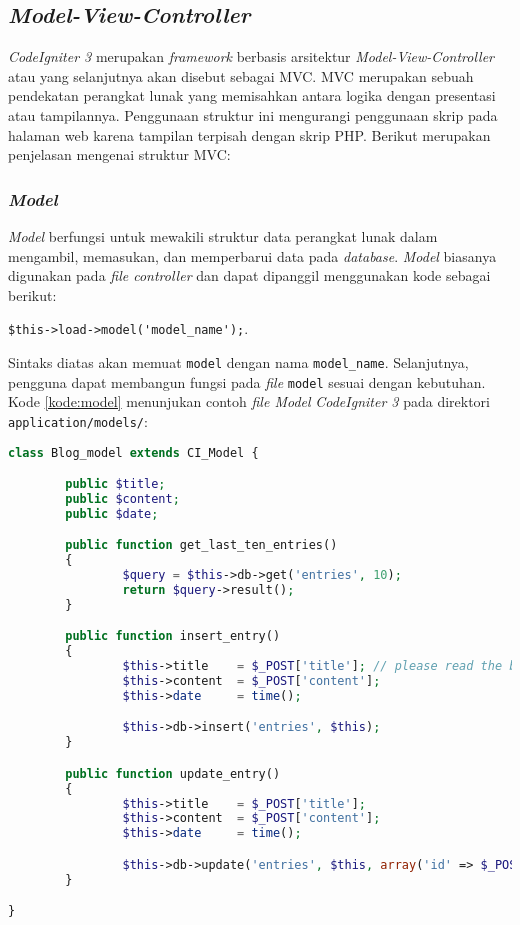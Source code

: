 \subsection{\textit{Model-View-Controller}}
\textit{CodeIgniter 3} merupakan \textit{framework} berbasis arsitektur \textit{Model-View-Controller} atau yang selanjutnya akan disebut sebagai MVC. MVC merupakan sebuah pendekatan perangkat lunak yang memisahkan antara logika dengan presentasi atau tampilannya. Penggunaan struktur ini mengurangi penggunaan skrip pada halaman web karena tampilan terpisah dengan skrip PHP. Berikut merupakan penjelasan mengenai struktur MVC:

\subsubsection{\textit{Model}} \textit{Model} berfungsi untuk mewakili struktur data perangkat lunak dalam mengambil, memasukan, dan memperbarui data pada \textit{database}. \textit{Model} biasanya digunakan pada \textit{file controller} dan dapat dipanggil menggunakan kode sebagai berikut: 
\begin{center}
\verb|$this->load->model('model_name');|.
\end{center}
Sintaks diatas akan memuat \texttt{model} dengan nama \texttt{model\_name}. Selanjutnya, pengguna dapat membangun fungsi pada \textit{file} \texttt{model} sesuai dengan kebutuhan. Kode \ref{kode:model} menunjukan contoh \textit{file Model} \textit{CodeIgniter 3} pada direktori \verb|application/models/|:

\begin{lstlisting}[language=PHP, caption=Contoh \textit{model} pada \textit{CodeIgniter 3}, label=kode:model]
class Blog_model extends CI_Model {

        public $title;
        public $content;
        public $date;

        public function get_last_ten_entries()
        {
                $query = $this->db->get('entries', 10);
                return $query->result();
        }

        public function insert_entry()
        {
                $this->title    = $_POST['title']; // please read the below note
                $this->content  = $_POST['content'];
                $this->date     = time();

                $this->db->insert('entries', $this);
        }

        public function update_entry()
        {
                $this->title    = $_POST['title'];
                $this->content  = $_POST['content'];
                $this->date     = time();

                $this->db->update('entries', $this, array('id' => $_POST['id']));
        }

}
\end{lstlisting}

